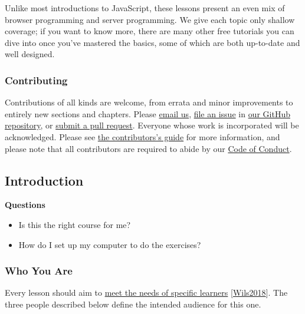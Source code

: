 Unlike most introductions to JavaScript, these lessons present an even
mix of browser programming and server programming. We give each topic
only shallow coverage; if you want to know more, there are many other
free tutorials you can dive into once you've mastered the basics, some
of which are both up-to-date and well designed.

\subsubsection{Contributing}\label{s:intro-contrib}

Contributions of all kinds are welcome, from errata and minor
improvements to entirely new sections and chapters. Please
\href{mailto:gvwilson@third-bit.com}{email us},
\href{https://github.com/software-tools-in-javascript/js-vs-ds/issues}{file
an issue} in
\href{https://github.com/software-tools-in-javascript/js-vs-ds/}{our
GitHub repository}, or
\href{https://github.com/software-tools-in-javascript/js-vs-ds/pulls}{submit
a pull request}. Everyone whose work is incorporated will be
acknowledged. Please see \protect\hyperlink{s:contributing}{the
contributors's guide} for more information, and please note that all
contributors are required to abide by our
\protect\hyperlink{s:conduct}{Code of Conduct}.

\hypertarget{s:intro}{\subsection{Introduction}\label{s:intro}}

\textbf{Questions}

\begin{itemize}
\tightlist
\item
  Is this the right course for me?
\item
  How do I set up my computer to do the exercises?
\end{itemize}

\subsubsection{Who You Are}\label{s:intro-personas}

Every lesson should aim to
\href{http://teachtogether.tech/en/process/}{meet the needs of specific
learners} {[}\protect\hyperlink{b:Wils2018}{Wils2018}{]}. The three
people described below define the intended audience for this one.

